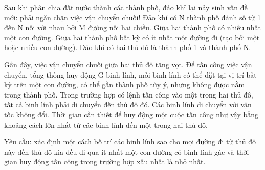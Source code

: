 Sau khi phân chia đất nước thành các thành phố, đảo khỉ lại nảy sinh vấn đề mới: phải ngăn chặn việc vận chuyển chuối! Đảo khí có N thành phố đánh số từ 1 đến N nối với nhau bởi M đường nối hai   chiều. Giữa hai thành phố có nhiều nhất một con đường. Giữa hai thành phố bất kỳ có ít nhất một đường đi (tạo bởi một hoặc nhiều con đường). Đảo khỉ có hai thủ đô là thành phố 1 và thành phố N.  

   Gần đây, việc vận chuyển chuối giữa hai thủ đô tăng vọt. Để tấn công việc vận chuyển, tổng thống huy động G binh lính, mỗi binh lính có thể đặt tại vị trí bất kỳ trên một con đường, có thể gần thành phố   tùy ý, nhưng không được nằm trong thành phố. Trong trường hợp có lệnh tấn công vào một trong hai thủ đô, tất cả binh lính phải di chuyển đến thủ đô đó. Các binh lính di chuyển với vận tốc không đổi. Thời   gian cần thiết để huy động một cuộc tấn công như vậy bằng khoảng cách lớn nhất từ các binh lính đến một trong hai thủ đô.  

   Yêu cầu: xác định một cách bố trí các binh lính sao cho mọi đường đi từ thủ đô này đến thủ đô kia đều đi qua ít nhất một con đường có binh lính gác và thời gian huy động tấn công trong trường hợp xấu   nhất là nhỏ nhất.